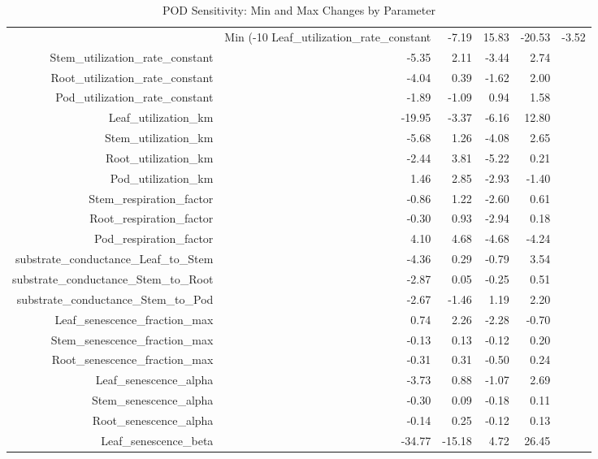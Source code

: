 \begin{table}[ht]
\centering
\caption{POD Sensitivity: Min and Max Changes by Parameter} 
\label{tab:pod_sensitivity}
\begin{tabular}{rrrrr}
  \hline
 & Min (-10%
  \hline
Leaf\_utilization\_rate\_constant & -7.19 & 15.83 & -20.53 & -3.52 \\ 
  Stem\_utilization\_rate\_constant & -5.35 & 2.11 & -3.44 & 2.74 \\ 
  Root\_utilization\_rate\_constant & -4.04 & 0.39 & -1.62 & 2.00 \\ 
  Pod\_utilization\_rate\_constant & -1.89 & -1.09 & 0.94 & 1.58 \\ 
  Leaf\_utilization\_km & -19.95 & -3.37 & -6.16 & 12.80 \\ 
  Stem\_utilization\_km & -5.68 & 1.26 & -4.08 & 2.65 \\ 
  Root\_utilization\_km & -2.44 & 3.81 & -5.22 & 0.21 \\ 
  Pod\_utilization\_km & 1.46 & 2.85 & -2.93 & -1.40 \\ 
  Stem\_respiration\_factor & -0.86 & 1.22 & -2.60 & 0.61 \\ 
  Root\_respiration\_factor & -0.30 & 0.93 & -2.94 & 0.18 \\ 
  Pod\_respiration\_factor & 4.10 & 4.68 & -4.68 & -4.24 \\ 
  substrate\_conductance\_Leaf\_to\_Stem & -4.36 & 0.29 & -0.79 & 3.54 \\ 
  substrate\_conductance\_Stem\_to\_Root & -2.87 & 0.05 & -0.25 & 0.51 \\ 
  substrate\_conductance\_Stem\_to\_Pod & -2.67 & -1.46 & 1.19 & 2.20 \\ 
  Leaf\_senescence\_fraction\_max & 0.74 & 2.26 & -2.28 & -0.70 \\ 
  Stem\_senescence\_fraction\_max & -0.13 & 0.13 & -0.12 & 0.20 \\ 
  Root\_senescence\_fraction\_max & -0.31 & 0.31 & -0.50 & 0.24 \\ 
  Leaf\_senescence\_alpha & -3.73 & 0.88 & -1.07 & 2.69 \\ 
  Stem\_senescence\_alpha & -0.30 & 0.09 & -0.18 & 0.11 \\ 
  Root\_senescence\_alpha & -0.14 & 0.25 & -0.12 & 0.13 \\ 
  Leaf\_senescence\_beta & -34.77 & -15.18 & 4.72 & 26.45 \\ 

\end{tabular}
\end{table}
